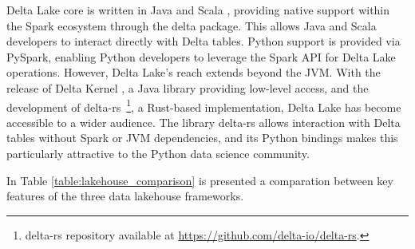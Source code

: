 Delta Lake  core is written in Java and Scala \cite{deltalake_tech_docs}, providing native support within the Spark ecosystem through the delta package. This allows Java and Scala developers to interact directly with Delta tables. Python support is provided via PySpark, enabling Python developers to leverage the Spark \gls{API} for Delta Lake operations.  However, Delta Lake's reach extends beyond the \gls{JVM}.  With the release of Delta Kernel \cite{AnnouncingDeltaLake2023}, a Java library providing low-level access, and the development of delta-rs~\footnote{delta-rs repository available at \url{https://github.com/delta-io/delta-rs}.}, a Rust-based implementation, Delta Lake has become accessible to a wider audience.  The library delta-rs allows interaction with Delta tables without Spark or \gls{JVM} dependencies, and its Python bindings makes this particularly attractive to the Python data science community.



\medspace
In Table \ref{table:lakehouse_comparison} is presented a comparation between key features of the three data lakehouse frameworks.



